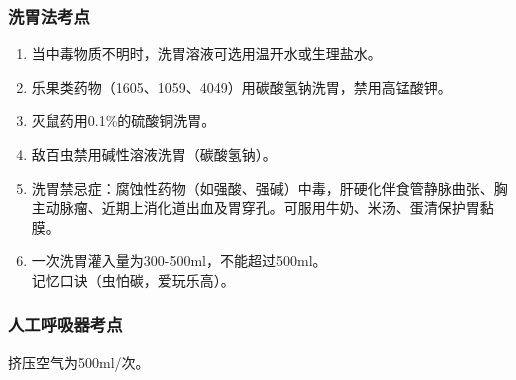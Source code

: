 \documentclass[11pt, a4paper]{ctexart}
\begin{document}
\subsubsection{洗胃法考点}
\begin{enumerate}
	\item 当中毒物质不明时，洗胃溶液可选用温开水或生理盐水。
	\item 乐果类药物（1605、1059、4049）用碳酸氢钠洗胃，禁用高锰酸钾。
	\item 灭鼠药用0.1\%的硫酸铜洗胃。
	\item 敌百虫禁用碱性溶液洗胃（碳酸氢钠）。
	\item 洗胃禁忌症：腐蚀性药物（如强酸、强碱）中毒，肝硬化伴食管静脉曲张、胸主动脉瘤、近期上消化道出血及胃穿孔。可服用牛奶、米汤、蛋清保护胃黏膜。
	\item 一次洗胃灌入量为300-500ml，不能超过500ml。\\
	      记忆口诀（虫怕碳，爱玩乐高）。
\end{enumerate}

\subsubsection{人工呼吸器考点}
挤压空气为500ml/次。
\end{document}
